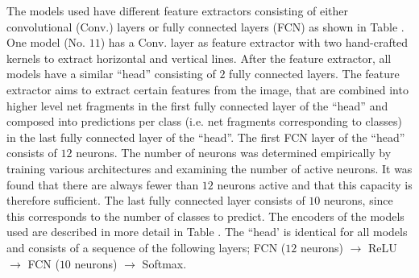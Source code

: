 The models used have different feature extractors consisting of either convolutional (Conv.) layers or fully connected layers (FCN) as shown in Table .
One model (No. $11$) has a Conv. layer as feature extractor with two hand-crafted kernels to extract horizontal and vertical lines.
After the feature extractor, all models have a similar ``head'' consisting of $2$ fully connected layers.
The feature extractor aims to extract certain features from the image, that are combined into higher level net fragments in the first fully connected layer of the ``head'' and composed into predictions per class (i.e. net fragments corresponding to classes) in the last fully connected layer of the ``head''.
The first FCN layer of the ``head'' consists of $12$ neurons.
The number of neurons was determined empirically by training various architectures and examining the number of active neurons.
It was found that there are always fewer than $12$ neurons active and that this capacity is therefore sufficient.
The last fully connected layer consists of $10$ neurons, since this corresponds to the number of classes to predict.
The encoders of the models used are described in more detail in Table .
The ``head' is identical for all models and consists of a sequence of the following layers; FCN ($12$ neurons) $\rightarrow$ ReLU $\rightarrow$ FCN ($10$ neurons) $\rightarrow$ Softmax.

